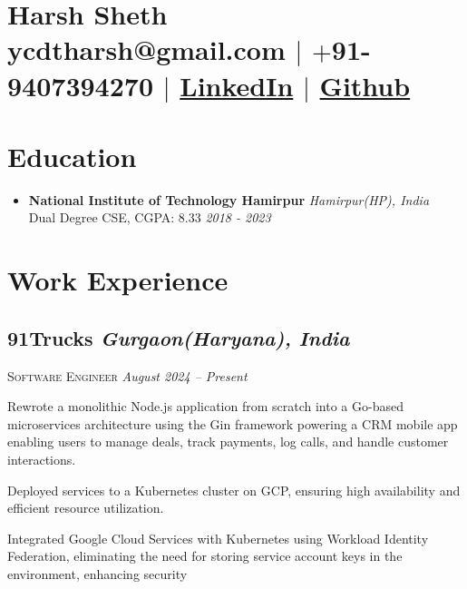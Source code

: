 \documentclass[10pt]{article}
\begin{document}
\section{\Large{Harsh Sheth}\\ \large \normalfont ycdtharsh@gmail.com $|$ \normalfont $+$91-9407394270 $|$  \href{https://www.linkedin.com/in/harsh-sheth-2101}{LinkedIn} $|$ \href{https://github.com/harsh-sheth}{Github}}

\section{Education}
\begin{itemize}
  \item{
      \textbf{National Institute of Technology Hamirpur} \hfill \textit{Hamirpur(HP), India}\\
      Dual Degree CSE, CGPA: 8.33 \hfill \textit{ 2018 - 2023}
  } 
\end{itemize}


\section{Work Experience}

\subsection*{91Trucks \hfill \normalsize \normalfont \textit{Gurgaon(Haryana), India}}
\vspace{-1ex}
\textsc{\textmd{Software Engineer}} \hfill \normalsize \textit{August 2024 --  Present}
\vspace{-1ex}

\begin{description}
\setlength{\itemindent}{2\parindent}
\item[$\bullet$]{Rewrote a monolithic Node.js application from scratch into a Go-based microservices architecture using the Gin framework powering a CRM mobile app enabling users to manage deals, track payments, log calls, and handle customer interactions.}
\item[$\bullet$]{Deployed services to a Kubernetes cluster on GCP, ensuring high availability and efficient resource utilization.}
\item[$\bullet$]{Integrated Google Cloud Services with Kubernetes using Workload Identity Federation, eliminating the need for storing service account keys in the environment, enhancing security}
\end{description}
\end{document}
